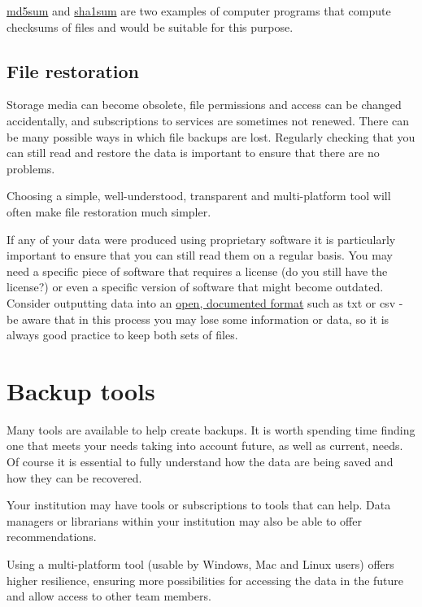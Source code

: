 \documentclass[a4paper,oneside]{report}
\begin{document}
\href{https://en.wikipedia.org/wiki/Md5sum}{md5sum} and
\href{https://en.wikipedia.org/wiki/Sha1sum}{sha1sum} are two examples
of computer programs that compute checksums of files and would be
suitable for this purpose.

\hypertarget{file-restoration}{%
\subsection{File restoration}\label{file-restoration}}

Storage media can become obsolete, file permissions and access can be
changed accidentally, and subscriptions to services are sometimes not
renewed. There can be many possible ways in which file backups are lost.
Regularly checking that you can still read and restore the data is
important to ensure that there are no problems.

Choosing a simple, well-understood, transparent and multi-platform tool
will often make file restoration much simpler.

If any of your data were produced using proprietary software it is
particularly important to ensure that you can still read them on a
regular basis. You may need a specific piece of software that requires a
license (do you still have the license?) or even a specific version of
software that might become outdated. Consider outputting data into an
\protect\hyperlink{data-file-formats}{open, documented format} such as
txt or csv - be aware that in this process you may lose some information
or data, so it is always good practice to keep both sets of files.

\hypertarget{backup-tools}{%
\section{Backup tools}\label{backup-tools}}

Many tools are available to help create backups. It is worth spending
time finding one that meets your needs taking into account future, as
well as current, needs. Of course it is essential to fully understand
how the data are being saved and how they can be recovered.

Your institution may have tools or subscriptions to tools that can help.
Data managers or librarians within your institution may also be able to
offer recommendations.

Using a multi-platform tool (usable by Windows, Mac and Linux users)
offers higher resilience, ensuring more possibilities for accessing the
data in the future and allow access to other team members.
\end{document}
